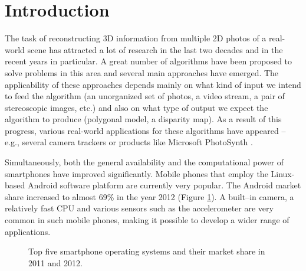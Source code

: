 \chapter*{Introduction}

The task of reconstructing 3D information from multiple 2D photos of a real-world scene has attracted a lot of research in the last two decades and in the recent years in particular.
A great number of algorithms have been proposed to solve problems in this area and several main approaches have emerged. 
The applicability of these approaches depends mainly on what kind of input we intend to feed the algorithm 
(an unorganized set of photos, a video stream, a pair of stereoscopic images, etc.) 
and also on what type of output we expect the algorithm to produce (polygonal model, a disparity map). 
As a result of this progress, various real-world applications for these algorithms have appeared -- 
e.g., several camera trackers or products like Microsoft PhotoSynth \cite{snavely2008}.

Simultaneously, both the general availability and the computational power of smartphones have improved significantly.
Mobile phones that employ the Linux-based Android software platform are currently very popular. 
The Android market share increased to almost 69\% in the year 2012 \cite{marketshare} (Figure \ref{fig:market_share}). 
A built–in camera, a relatively fast CPU and various sensors such as the accelerometer are very common in such mobile phones, making it possible to develop a wider range of applications.

\begin{figure}[h]
  \caption{Top five smartphone operating systems and their market share in 2011 and 2012.}
  \label{fig:market_share}
\end{figure}


